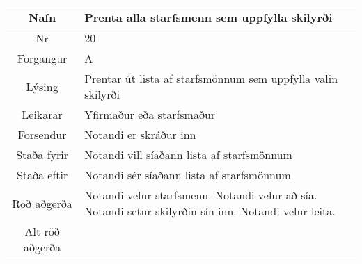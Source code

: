 \documentclass[a4paper]{article}
\begin{document}
\begin{tabular}{|c|p{10cm}|}
\hline
Nafn&Prenta alla starfsmenn sem uppfylla skilyrði\\
\hline
Nr&20\\
\hline
Forgangur&A\\
\hline
Lýsing&Prentar út lista af starfsmönnum sem uppfylla valin skilyrði\\
\hline
Leikarar&Yfirmaður eða starfsmaður\\
\hline
Forsendur&Notandi er skráður inn\\
\hline
Staða fyrir&Notandi vill síaðann lista af starfsmönnum\\
\hline
Staða eftir&Notandi sér síaðann lista af starfsmönnum\\
\hline
Röð aðgerða&Notandi velur starfsmenn. Notandi velur að sía. Notandi setur skilyrðin sín inn. Notandi velur leita.\\
\hline
Alt röð aðgerða&\\
\hline
\end{tabular}
\end{document}
